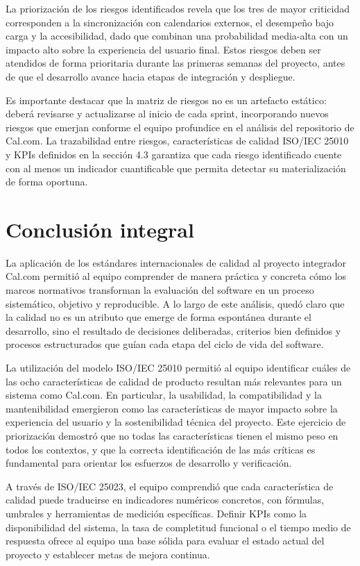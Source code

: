 \documentclass{article}
\begin{document}
La priorización de los riesgos identificados revela que los tres de mayor criticidad corresponden a la sincronización con calendarios externos, el desempeño bajo carga y la accesibilidad, dado que combinan una probabilidad media-alta con un impacto alto sobre la experiencia del usuario final. Estos riesgos deben ser atendidos de forma prioritaria durante las primeras semanas del proyecto, antes de que el desarrollo avance hacia etapas de integración y despliegue.

Es importante destacar que la matriz de riesgos no es un artefacto estático: deberá revisarse y actualizarse al inicio de cada sprint, incorporando nuevos riesgos que emerjan conforme el equipo profundice en el análisis del repositorio de Cal.com. La trazabilidad entre riesgos, características de calidad ISO/IEC 25010 y KPIs definidos en la sección 4.3 garantiza que cada riesgo identificado cuente con al menos un indicador cuantificable que permita detectar su materialización de forma oportuna.

\newpage
\section{Conclusión integral}

La aplicación de los estándares internacionales de calidad al proyecto integrador Cal.com permitió al equipo comprender de manera práctica y concreta cómo los marcos normativos transforman la evaluación del software en un proceso sistemático, objetivo y reproducible. A lo largo de este análisis, quedó claro que la calidad no es un atributo que emerge de forma espontánea durante el desarrollo, sino el resultado de decisiones deliberadas, criterios bien definidos y procesos estructurados que guían cada etapa del ciclo de vida del software.

La utilización del modelo ISO/IEC 25010 permitió al equipo identificar cuáles de las ocho características de calidad de producto resultan más relevantes para un sistema como Cal.com. En particular, la usabilidad, la compatibilidad y la mantenibilidad emergieron como las características de mayor impacto sobre la experiencia del usuario y la sostenibilidad técnica del proyecto. Este ejercicio de priorización demostró que no todas las características tienen el mismo peso en todos los contextos, y que la correcta identificación de las más críticas es fundamental para orientar los esfuerzos de desarrollo y verificación.

A través de ISO/IEC 25023, el equipo comprendió que cada característica de calidad puede traducirse en indicadores numéricos concretos, con fórmulas, umbrales y herramientas de medición específicas. Definir KPIs como la disponibilidad del sistema, la tasa de completitud funcional o el tiempo medio de respuesta ofrece al equipo una base sólida para evaluar el estado actual del proyecto y establecer metas de mejora continua.
\end{document}
